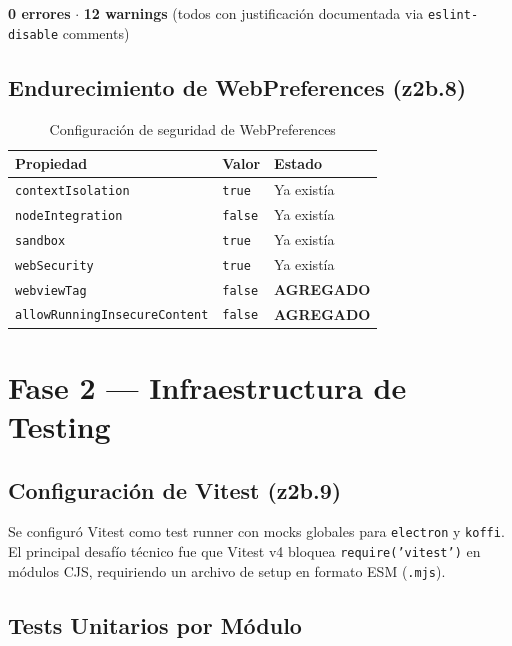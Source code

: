 \documentclass[12pt,a4paper]{article}
\begin{document}
\begin{infobox}
\textbf{0 errores} $\cdot$ \textbf{12 warnings} (todos con justificaci\'on documentada via \texttt{eslint-disable} comments)
\end{infobox}

\subsection{Endurecimiento de WebPreferences (z2b.8)}

\begin{table}[H]
\centering
\renewcommand{\arraystretch}{1.3}
\begin{tabular}{l l l}
\toprule
\textbf{Propiedad} & \textbf{Valor} & \textbf{Estado} \\
\midrule
\texttt{contextIsolation} & \texttt{true} & Ya exist\'ia \\
\texttt{nodeIntegration} & \texttt{false} & Ya exist\'ia \\
\texttt{sandbox} & \texttt{true} & Ya exist\'ia \\
\texttt{webSecurity} & \texttt{true} & Ya exist\'ia \\
\texttt{webviewTag} & \texttt{false} & \textcolor{accentgreen}{\textbf{AGREGADO}} \\
\texttt{allowRunningInsecureContent} & \texttt{false} & \textcolor{accentgreen}{\textbf{AGREGADO}} \\
\bottomrule
\end{tabular}
\caption{Configuraci\'on de seguridad de WebPreferences}
\end{table}

\section{Fase 2 --- Infraestructura de Testing}

\subsection{Configuraci\'on de Vitest (z2b.9)}
Se configur\'o Vitest como test runner con mocks globales para \texttt{electron} y \texttt{koffi}. El principal desaf\'io t\'ecnico fue que Vitest v4 bloquea \texttt{require('vitest')} en m\'odulos CJS, requiriendo un archivo de setup en formato ESM (\texttt{.mjs}).

\subsection{Tests Unitarios por M\'odulo}
\end{document}
